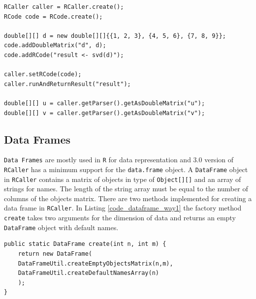 \documentclass[10pt,a4paper, final, oneside]{article}
\begin{document}
\begin{minipage}{\linewidth}
\begin{lstlisting}[caption=Transferring Matrices,label=code_java_svd]
RCaller caller = RCaller.create();
RCode code = RCode.create();

double[][] d = new double[][]{{1, 2, 3}, {4, 5, 6}, {7, 8, 9}};
code.addDoubleMatrix("d", d);
code.addRCode("result <- svd(d)");

caller.setRCode(code);
caller.runAndReturnResult("result");

double[][] u = caller.getParser().getAsDoubleMatrix("u");
double[][] v = caller.getParser().getAsDoubleMatrix("v");
\end{lstlisting}
\end{minipage}


\subsection{Data Frames}
\label{sec:data_frames}
\texttt{Data Frames} are mostly used in \texttt{R} for data representation and $3.0$ version of \texttt{RCaller} has a minimum support for the \texttt{data.frame} object. A \texttt{DataFrame} object in \texttt{RCaller} contains a matrix of objects in type of \texttt{Object[][]} and an array of strings for names. The length of the string array must be equal to the number of columns of the objects matrix. There are two methods implemented for creating a data frame in \texttt{RCaller}. In Listing \ref{code_dataframe_way1} the factory method \texttt{create} takes two arguments for the dimension of data and returns an empty \texttt{DataFrame} object with default names. 


\begin{minipage}{\linewidth}
\begin{lstlisting}[caption=Default DataFrame Creator,label=code_dataframe_way1]
public static DataFrame create(int n, int m) {
    return new DataFrame(
    DataFrameUtil.createEmptyObjectsMatrix(n,m), 
    DataFrameUtil.createDefaultNamesArray(n)
    );
}
\end{lstlisting}
\end{minipage}
\end{document}

